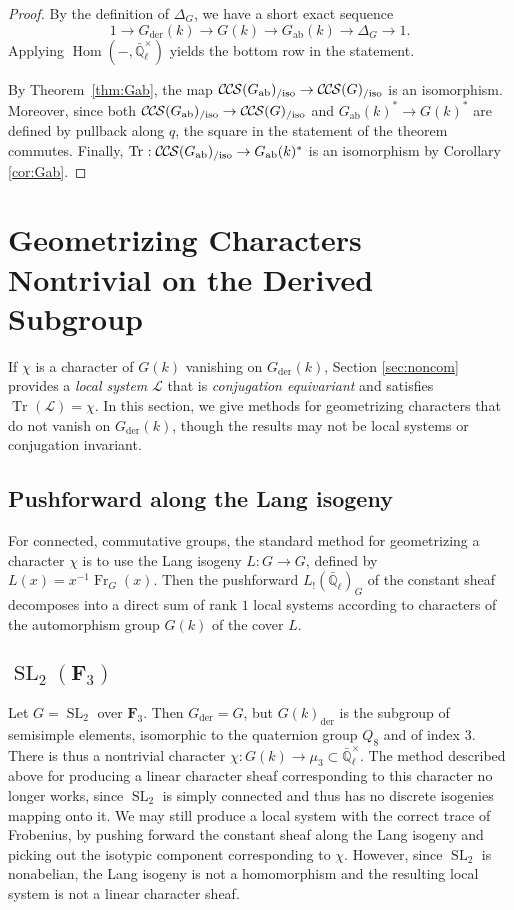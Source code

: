 \documentclass[10pt]{amsart}
\theoremstyle{plain}
\theoremstyle{definition}
\newcommand{\FFF}{{\mathbf{F}_3}}
\newcommand{\EE}{\mathbb{\bar Q}_\ell}
\newcommand{\EEx}{\EE^\times}
\newcommand{\Frob}[1]{\operatorname{Fr}_{#1}}
\DeclareMathOperator{\Hom}{Hom}
\DeclareMathOperator{\SL}{SL}
\newcommand{\der}{_{\operatorname{der}}}
\newcommand{\ab}{_{\operatorname{ab}}}
\DeclareMathOperator{\Tr}{Tr}
\newcommand{\TrFrob}[1]{\Tr_{#1}}
\newcommand{\cs}[1]{{\mathcal{#1}}}
\newcommand{\CCS}{{\mathcal{C\hskip-.8pt C\hskip-0.8pt S}}}
\newcommand{\CCSiso}[1]{\CCS(#1)_{/\text{iso}}}
\begin{document}
\begin{proof}
By the definition of $\Delta_G$, we have a short exact sequence
\[
1 \to G\der(k) \to G(k) \to G\ab(k) \to \Delta_G \to 1.
\]
Applying $\Hom(-, \EEx)$ yields the bottom row in the statement.

By Theorem~\ref{thm:Gab}, the map $\CCSiso{G\ab} \to \CCSiso{G}$ is an isomorphism.
Moreover, since both $\CCSiso{G\ab} \to \CCSiso{G}$ and $G\ab(k)^* \to G(k)^*$ are
defined by pullback along $q$, the square in the statement of the theorem commutes.
Finally, $\TrFrob{} : \CCSiso{G\ab} \to G\ab(k)^*$ is an isomorphism by Corollary \ref{cor:Gab}.
\end{proof}

\section{Geometrizing Characters Nontrivial on the Derived Subgroup} \label{sec:badchar}

If $\chi$ is a character of $G(k)$ vanishing on $G\der(k)$, Section \ref{sec:noncom} provides a \emph{local system} $\cs{L}$ that is \emph{conjugation equivariant} and satisfies $\TrFrob{}(\cs{L}) = \chi$.   In this section, we give methods for geometrizing characters that do not vanish on $G\der(k)$, though the results may not be local systems or conjugation invariant.

\subsection{Pushforward along the Lang isogeny}

For connected, commutative groups, the standard method for geometrizing a character $\chi$ is to use the Lang isogeny $L : G \to G$, defined by $L(x) = x^{-1}\Frob{G}(x)$.  Then the pushforward $L_! (\EE)_G$ of the constant sheaf decomposes into a direct sum of rank $1$ local systems according to characters of the automorphism group $G(k)$ of the cover $L$.

\subsection{\texorpdfstring{$\SL_2(\FFF)$}{\SL(2, 3)}}

Let $G = \SL_2$ over $\FFF$.  Then $G\der = G$, but $G(k)\der$ is the subgroup of semisimple elements, isomorphic to the quaternion group $Q_8$ and of index $3$.  There is thus a nontrivial character $\chi : G(k) \to \mu_3 \subset \EEx$.  The method described above for producing a linear character sheaf corresponding to this character no longer works, since $\SL_2$ is simply connected and thus has no discrete isogenies mapping onto it.  We may still produce a local system with the correct trace of Frobenius, by pushing forward the constant sheaf along the Lang isogeny and picking out the isotypic component corresponding to $\chi$.  However, since $\SL_2$ is nonabelian, the Lang isogeny is not a homomorphism and the resulting local system is not a linear character sheaf.
\end{document}
